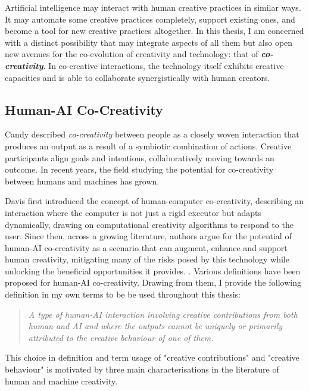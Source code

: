 Artificial intelligence may interact with human creative practices in similar ways. It may automate some creative practices completely, support existing ones, and become a tool for new creative practices altogether. In this thesis, I am concerned with a distinct possibility that may integrate aspects of all them but also open new avenues for the co-evolution of creativity and technology: that of \textit{\textbf{co-creativity}}. In co-creative interactions, the technology itself exhibits creative capacities and is able to collaborate synergistically with human creators.

\subsection{Human-AI Co-Creativity}

Candy \cite{Candy2002-ra} described \textit{co-creativity} between people as a closely woven interaction that produces an output as a result of a symbiotic combination of actions. Creative participants align goals and intentions, collaboratively moving towards an outcome. In recent years, the field studying the potential for co-creativity between humans and machines has grown. 

Davis \cite{Davis2013-jy} first introduced the concept of human-computer co-creativity, describing an interaction where the computer is not just a rigid executor but adapts dynamically, drawing on computational creativity algorithms to respond to the user. Since then, across a growing literature, authors argue for the potential of human-AI co-creativity as a scenario that can augment, enhance and support human creativity, mitigating many of the risks posed by this technology while unlocking the beneficial opportunities it provides.  \cite{Yannakakis2014-zs,Kantosalo2020-zf,Rezwana2022-gg,Moruzzi2024-cq,Haase2024-yp,Lin2023-zq,Karimi2018-wi,Vinchon2023-gh}. Various definitions have been proposed for human-AI co-creativity. Drawing from them, I provide the following definition in my own terms to be be used throughout this thesis: 

\begin{quote}
\emph{A type of human-AI interaction involving creative contributions from both human and AI and where the outputs cannot be uniquely or primarily attributed to the creative behaviour of one of them.}
\end{quote}


This choice in definition and term usage of "creative contributions" and "creative behaviour" is motivated by three main characterisations in the literature of human and machine creativity. 

